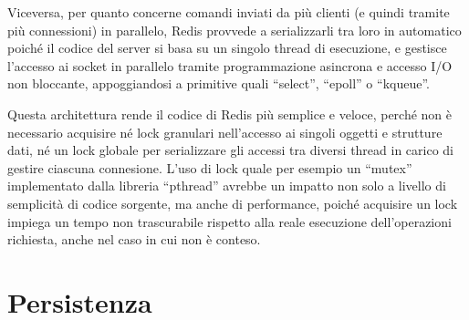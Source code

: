 Viceversa, per quanto concerne comandi inviati da più clienti (e quindi tramite più connessioni) in parallelo,
Redis provvede a serializzarli tra loro in automatico poiché il codice del server si basa su un singolo thread
di esecuzione, e gestisce l'accesso ai socket in parallelo tramite programmazione asincrona e accesso
I/O non bloccante, appoggiandosi a primitive quali ``select'', ``epoll'' o ``kqueue''. 

Questa architettura rende il codice di Redis più semplice e veloce, perché non è 
necessario acquisire né lock granulari nell'accesso ai singoli oggetti e strutture dati, né un lock globale per
serializzare gli accessi tra diversi thread in carico di gestire ciascuna connesione. L'uso di lock quale
per esempio un ``mutex'' implementato dalla libreria ``pthread'' avrebbe un impatto non solo a livello di semplicità di 
codice sorgente, ma anche di performance, poiché acquisire un lock impiega un tempo non trascurabile rispetto alla
reale esecuzione dell'operazioni richiesta, anche nel caso in cui non è conteso.

\section{Persistenza}







